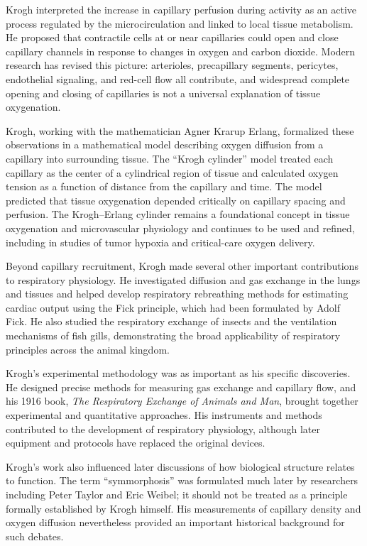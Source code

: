 Krogh interpreted the increase in capillary perfusion during activity as an active process regulated by the microcirculation and linked to local tissue metabolism. He proposed that contractile cells at or near capillaries could open and close capillary channels in response to changes in oxygen and carbon dioxide. Modern research has revised this picture: arterioles, precapillary segments, pericytes, endothelial signaling, and red-cell flow all contribute, and widespread complete opening and closing of capillaries is not a universal explanation of tissue oxygenation.\cite{krogh-microcirculation}

Krogh, working with the mathematician Agner Krarup Erlang, formalized these observations in a mathematical model describing oxygen diffusion from a capillary into surrounding tissue. The ``Krogh cylinder'' model treated each capillary as the center of a cylindrical region of tissue and calculated oxygen tension as a function of distance from the capillary and time. The model predicted that tissue oxygenation depended critically on capillary spacing and perfusion. The Krogh--Erlang cylinder remains a foundational concept in tissue oxygenation and microvascular physiology and continues to be used and refined, including in studies of tumor hypoxia and critical-care oxygen delivery.

Beyond capillary recruitment, Krogh made several other important contributions to respiratory physiology. He investigated diffusion and gas exchange in the lungs and tissues and helped develop respiratory rebreathing methods for estimating cardiac output using the Fick principle, which had been formulated by Adolf Fick. He also studied the respiratory exchange of insects and the ventilation mechanisms of fish gills, demonstrating the broad applicability of respiratory principles across the animal kingdom.

Krogh's experimental methodology was as important as his specific discoveries. He designed precise methods for measuring gas exchange and capillary flow, and his 1916 book, \emph{The Respiratory Exchange of Animals and Man}, brought together experimental and quantitative approaches. His instruments and methods contributed to the development of respiratory physiology, although later equipment and protocols have replaced the original devices.

Krogh's work also influenced later discussions of how biological structure relates to function. The term ``symmorphosis'' was formulated much later by researchers including Peter Taylor and Eric Weibel; it should not be treated as a principle formally established by Krogh himself. His measurements of capillary density and oxygen diffusion nevertheless provided an important historical background for such debates.\cite{krogh-microcirculation}

